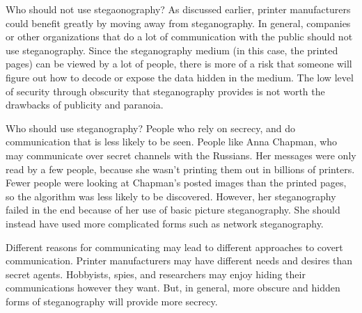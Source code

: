 	Who should not use stegaonography? As discussed earlier, printer manufacturers could benefit greatly by moving away from steganography. In general, companies or other organizations that do a lot of communication with the public should not use steganography. Since the steganography medium (in this case, the printed pages) can be viewed by a lot of people, there is more of a risk that someone will figure out how to decode or expose the data hidden in the medium. The low level of security through obscurity that steganography provides is not worth the drawbacks of publicity and paranoia. 

	Who should use steganography? People who rely on secrecy, and do communication that is less likely to be seen. People like Anna Chapman, who may communicate over secret channels with the Russians. Her messages were only read by a few people, because she wasn't printing them out in billions of printers. Fewer people were looking at Chapman's posted images than the printed pages, so the algorithm was less likely to be discovered. However, her steganography failed in the end because of her use of basic picture steganography. She should instead have used more complicated forms such as network steganography. 
	
	Different reasons for communicating may lead to different approaches to covert communication. Printer manufacturers may have different needs and desires than secret agents. Hobbyists, spies, and researchers may enjoy hiding their communications however they want. But, in general, more obscure and hidden forms of steganography will provide more secrecy. 


\appendix
